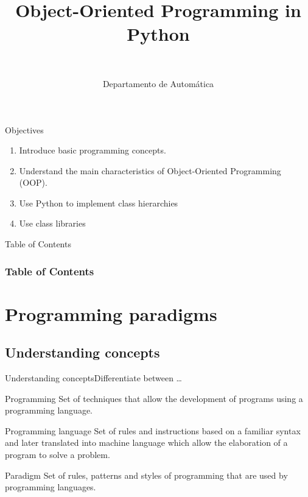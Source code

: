 \documentclass[10pt,compress]{beamer} %
\title[OOP in Python]{Object-Oriented Programming in Python}
\author{\asignatura\\\carrera}
\institute{}
\date{Departamento de Automática}
\begin{document}
{\titlepageBlue
    \begin{frame}
        \titlepage
    \end{frame}
}

\institute{\asignatura}

\begin{frame}[plain]{}
	\begin{block}{Objectives}
		\begin{enumerate}
		\item Introduce basic programming concepts.
		\item Understand the main characteristics of Object-Oriented Programming (OOP).
		\item Use Python to implement class hierarchies
		\item Use class libraries
		\end{enumerate}
	\end{block}
\end{frame}


{
\begin{frame}[shrink]{Table of Contents}
 \frametitle{Table of Contents}
    \begin{multicols}{2}
        \tableofcontents
    \end{multicols}
\end{frame}
}

\section[Programming paradigms]{Programming paradigms}

\subsection[Understanding concepts]{Understanding concepts}

\begin{frame}{Understanding concepts}{Differentiate between \ldots}
			\begin{block}{Programming}
				Set of techniques that allow the development of programs using a programming language.
			\end{block}
			\begin{block}{Programming language}
				Set of rules and instructions based on a familiar syntax and later translated into machine language which allow the elaboration of a program to solve a problem.			\end{block}
			\begin{block}{Paradigm}
Set of rules, patterns and styles of programming that are used by programming languages.
			\end{block}
\end{frame}
\end{document}
